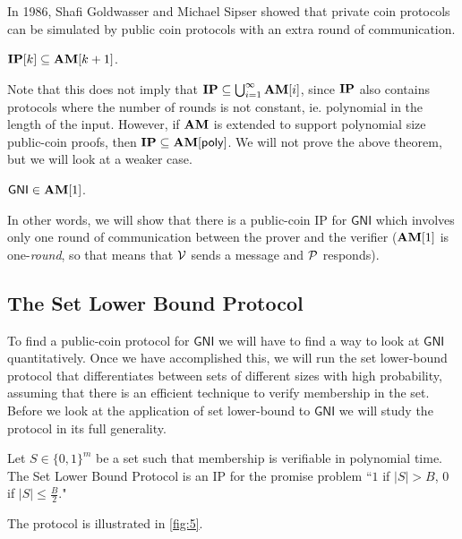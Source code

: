 In 1986, Shafi Goldwasser and Michael Sipser \cite{10.1145/12130.12137} showed that private coin protocols can be simulated by public coin protocols with an extra round of communication.

\begin{theorem}
	$\mathbf{IP}[k]\subseteq\mathbf{AM}[k+1]$.
\end{theorem}

Note that this does not imply that $\mathbf{IP}\subseteq\bigcup_{i=1}^{\infty}\mathbf{AM}[i]$, since $\mathbf{IP}$ also contains protocols where the number of rounds is not constant, ie. polynomial in the length of the input. However, if $\mathbf{AM}$ is extended to support polynomial size public-coin proofs, then $\mathbf{IP}\subseteq\mathbf{AM}[\mathsf{poly}]$. We will not prove the above theorem, but we will look at a weaker case.

\begin{theorem}
	$\mathsf{GNI}\in\mathbf{AM}[1]$.
\end{theorem}

In other words, we will show that there is a public-coin IP for $\mathsf{GNI}$ which involves only one round of communication between the prover and the verifier ($\mathbf{AM}[1]$ is one-\textit{round}, so that means that $\mathcal{V}$ sends a message and $\mathcal{P}$ responds).

\subsection{The Set Lower Bound Protocol}

To find a public-coin protocol for $\mathsf{GNI}$ we will have to find a way to look at $\mathsf{GNI}$ quantitatively. Once we have accomplished this, we will run the set lower-bound protocol that differentiates between sets of different sizes with high probability, assuming that there is an efficient technique to verify membership in the set. Before we look at the application of set lower-bound to $\mathsf{GNI}$ we will study the protocol in its full generality.

\begin{definition}
	Let $S\in\{0,1\}^m$ be a set such that membership is verifiable in polynomial time. The Set Lower Bound Protocol is an IP for the promise problem ``$1$ if $|S|>B$, $0$ if $|S|\leq\frac{B}{2}$."
\end{definition}

The protocol is illustrated in \ref{fig:5}.

